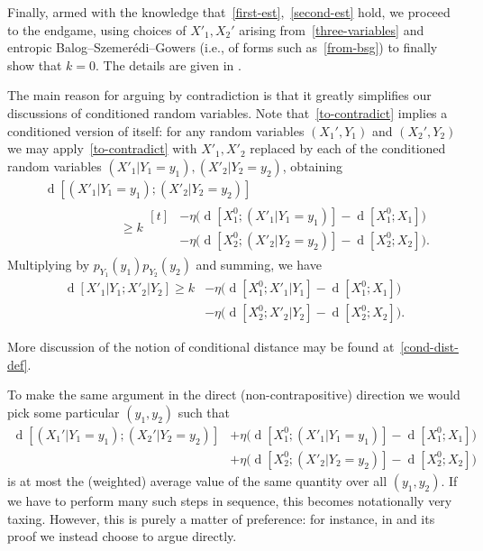 \documentclass[12pt,reqno,tbtags]{amsart}
\theoremstyle{definition}
\theoremstyle{remark}
\renewcommand{\geq}{\geqslant}
\newcommand{\dist}[2]{{\operatorname{d}[#1;#2]}} %
\newcommand{\costa}[1]{\eta\bigl(\dist{X_1^0}{#1} - \dist{X_1^0}{X_1}\bigr)} %
\newcommand{\costb}[1]{\eta\bigl(\dist{X_2^0}{#1} - \dist{X_2^0}{X_2}\bigr)} %
\numberwithin{equation}{section}
\begin{document}
  Finally, armed with the knowledge that~\eqref{first-est},~\eqref{second-est} hold, we proceed to the endgame, using choices of $X'_1,X_2'$ arising from~\eqref{three-variables} and entropic Balog--Szemer\'edi--Gowers (i.e., of forms such as~\eqref{from-bsg}) to finally show that $k = 0$.
The details are given in .

The main reason for arguing by contradiction is that it greatly simplifies our discussions of conditioned random variables.
Note that~\eqref{to-contradict} implies a conditioned version of itself:
for any random variables $(X_1',Y_1)$ and $(X_2',Y_2)$ we may apply~\eqref{to-contradict} with $X'_1, X'_2$ replaced by each of the conditioned random variables $(X'_1 | Y_1 = y_1) , (X'_2 | Y_2 = y_2)$, obtaining
\begin{align*}
  & \dist{(X'_1  | Y_1 = y_1)}{(X'_2 | Y_2 = y_2)} \\
  & \qquad\qquad\qquad \geq k \begin{aligned}[t] &- \costa{(X'_1 | Y_1 = y_1)} \\
&- \costb{(X'_2 | Y_2 = y_2)}. \end{aligned}
  \end{align*}
Multiplying by $p_{Y_1}(y_1) p_{Y_2}(y_2)$ and summing, we have
\begin{align}
  \nonumber
  \dist{X'_1 | Y_1}{X'_2 | Y_2}  \geq k  &- \costa{X'_1 | Y_1} \\
  \label{to-contradict-avg}
  &- \costb{X'_2 | Y_2}.
\end{align}

More discussion of the notion of conditional distance may be found at~\eqref{cond-dist-def}.

To make the same argument in the direct (non-contrapositive) direction we would pick some particular $(y_1,y_2)$ such that
\begin{align*}
  \dist{(X_1' | Y_1=y_1)}{(X_2' | Y_2=y_2)} &+ \costa{(X'_1 | Y_1 = y_1)} \\
                                            &+ \costb{(X'_2 | Y_2 = y_2)}
\end{align*}
is at most the (weighted) average value of the same quantity over all $(y_1,y_2)$.
If we have to perform many such steps in sequence, this becomes notationally very taxing.
However, this is purely a matter of preference: for instance, in  and its proof we instead choose to argue directly.
\end{document}
